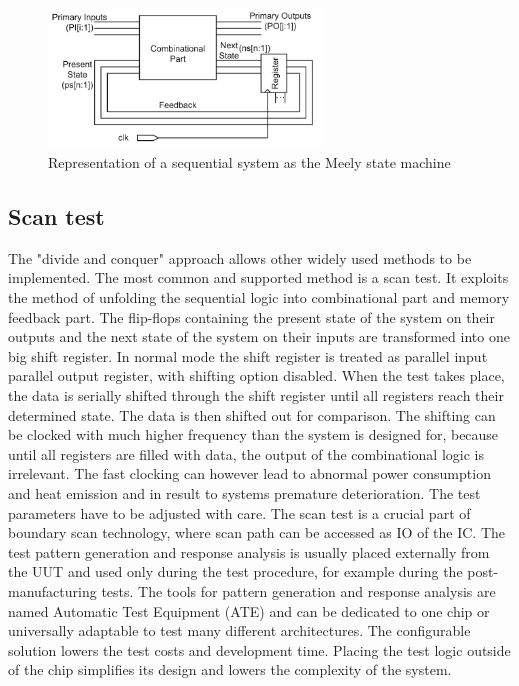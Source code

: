 \begin{figure}[H]
\centering
\includegraphics[width=0.65\textwidth]{figures/Meely.PNG}
\caption{Representation of a sequential system as the Meely state machine \cite{book:Navabi}}
\label{fig:Meely}
\end{figure}

\subsection{Scan test}
The "divide and conquer" approach allows other widely used methods to be implemented. The most common and supported method is a scan test. It exploits the method of unfolding the sequential logic into combinational part and memory feedback part. The flip-flops containing the present state of the system on their outputs and the next state of the system on their inputs are transformed into one big shift register. In normal mode the shift register is treated as parallel input parallel output register, with shifting option disabled. When the test takes place, the data is serially shifted through the shift register until all registers reach their determined state. The data is then shifted out for comparison. The shifting can be clocked with much higher frequency than the system is designed for, because until all registers are filled with data, the output of the combinational logic is irrelevant. The fast clocking can however lead to abnormal power consumption and heat emission and in result to systems premature deterioration. The test parameters have to be adjusted with care. The scan test is a crucial part of boundary scan technology, where scan path can be accessed as IO of the IC. The test pattern generation and response analysis is usually placed externally from the UUT and used only during the test procedure, for example during the post-manufacturing tests. The tools for pattern generation and response analysis are named Automatic Test Equipment (ATE) and can be dedicated to one chip or universally adaptable to test many different architectures. The configurable solution lowers the test costs and development time. Placing the test logic outside of the chip simplifies its design and lowers the complexity of the system.

